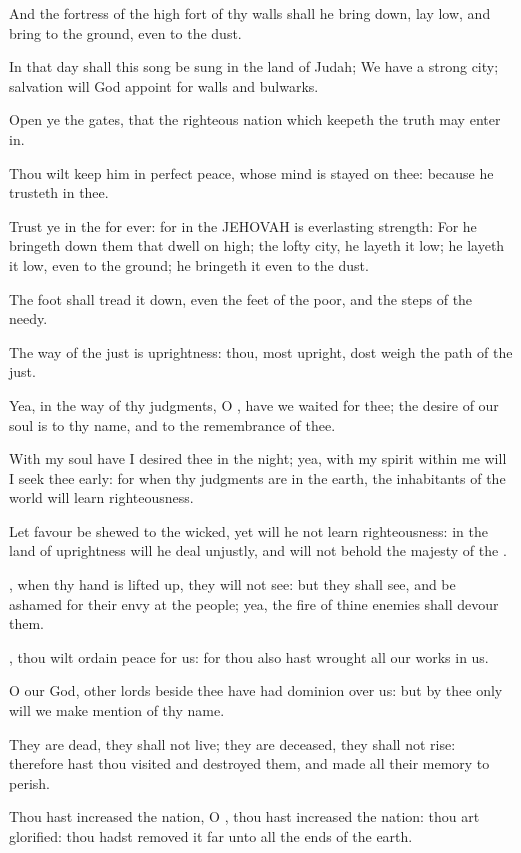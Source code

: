 \Verse And the fortress of the high fort of thy walls shall he bring down, lay low, and bring to the ground, even to the dust.


\Chapter
\Verse In that day shall this song be sung in the land of Judah; We have a strong city; salvation will God appoint for walls and bulwarks.

\Verse Open ye the gates, that the righteous nation which keepeth the truth may enter in.

\Verse Thou wilt keep him in perfect peace, whose mind is stayed on thee: because he trusteth in thee.

\Verse Trust ye in the \LORD for ever: for in the \LORD JEHOVAH is everlasting strength: \Verse For he bringeth down them that dwell on high; the lofty city, he layeth it low; he layeth it low, even to the ground; he bringeth it even to the dust.

\Verse The foot shall tread it down, even the feet of the poor, and the steps of the needy.

\Verse The way of the just is uprightness: thou, most upright, dost weigh the path of the just.

\Verse Yea, in the way of thy judgments, O \LORD, have we waited for thee; the desire of our soul is to thy name, and to the remembrance of thee.

\Verse With my soul have I desired thee in the night; yea, with my spirit within me will I seek thee early: for when thy judgments are in the earth, the inhabitants of the world will learn righteousness.

\Verse Let favour be shewed to the wicked, yet will he not learn righteousness: in the land of uprightness will he deal unjustly, and will not behold the majesty of the \LORD.

\Verse \LORD, when thy hand is lifted up, they will not see: but they shall see, and be ashamed for their envy at the people; yea, the fire of thine enemies shall devour them.

\Verse \LORD, thou wilt ordain peace for us: for thou also hast wrought all our works in us.

\Verse O \LORD our God, other lords beside thee have had dominion over us: but by thee only will we make mention of thy name.

\Verse They are dead, they shall not live; they are deceased, they shall not rise: therefore hast thou visited and destroyed them, and made all their memory to perish.

\Verse Thou hast increased the nation, O \LORD, thou hast increased the nation: thou art glorified: thou hadst removed it far unto all the ends of the earth.

